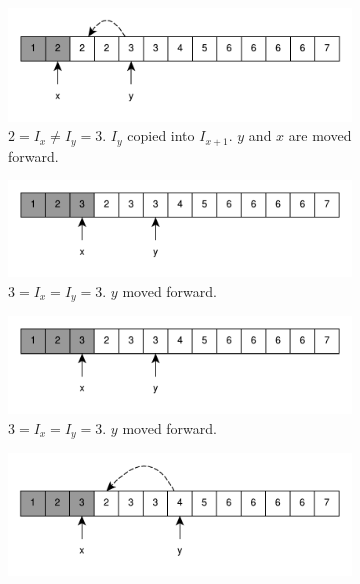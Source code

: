 \begin{figure}
	 \hfill
	 \begin{subfigure}[t]{0.45\textwidth}
		\includegraphics[width=1\linewidth]{sources/remove_duplicated_sorted_array_inplace/images/example1_4}
		\caption{$2 = I_x \neq I_y = 3$. $I_y$ copied into $I_{x+1}$. $y$ and $x$ are moved forward.}
		\label{fig:remove_duplicated_sorted_array_inplace:example1_4}
	 \end{subfigure}
	 \hfill
	 \begin{subfigure}[t]{0.45\textwidth}
		\includegraphics[width=1\linewidth]{sources/remove_duplicated_sorted_array_inplace/images/example1_5}
		\caption{$3 = I_x = I_y = 3$. $y$ moved forward.}
		\label{fig:remove_duplicated_sorted_array_inplace:example1_5}
	 \end{subfigure}
	 \hfill
	 \begin{subfigure}[t]{0.45\textwidth}
		\includegraphics[width=1\linewidth]{sources/remove_duplicated_sorted_array_inplace/images/example1_6}
		\caption{$3 = I_x = I_y = 3$. $y$ moved forward.}
		\label{fig:remove_duplicated_sorted_array_inplace:example1_6}
	 \end{subfigure}
	 \hfill
	 \begin{subfigure}[t]{0.45\textwidth}
		\includegraphics[width=1\linewidth]{sources/remove_duplicated_sorted_array_inplace/images/example1_7}

\end{subfigure}
\end{figure}
